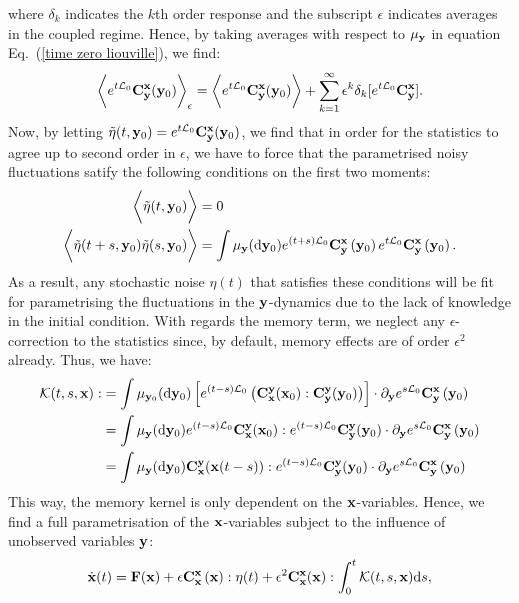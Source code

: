 \documentclass[12pt]{article}
\begin{document}
where $\delta_k$ indicates the $k$th order response and the subscript $\epsilon$ indicates averages in the coupled regime. Hence, by taking averages with respect to $\mu_{\mathbf{y}}$ in equation Eq.~(\ref{time zero liouville}), we find:
\begin{equation}
	\bigg\langle  e^{t\mathcal{L}_0}\mathbf{C}_{\mathbf{y}}^{\mathbf{x}}(\mathbf{y}_0) \bigg \rangle_{\epsilon} = \bigg\langle  e^{t\mathcal{L}_0}\mathbf{C}_{\mathbf{y}}^{\mathbf{x}}(\mathbf{y}_0) \bigg \rangle + \sum_{k=1}^{\infty}\epsilon ^{k}\delta_k [e^{t\mathcal{L}_0}\mathbf{C}^{\mathbf{x}}_{\mathbf{y}}].
\end{equation}
Now, by letting $\tilde{\eta}(t,\mathbf{y}_0)= e^{t\mathcal{L}_0}\mathbf{C}_{\mathbf{y}}^{\mathbf{x}}(\mathbf{y}_0)$, we find that in order for the statistics to agree up to second order in $\epsilon$, we have to force that the parametrised noisy fluctuations satify the following conditions on the first two moments:
\begin{align}\label{moments1}
	\bigg \langle \tilde{\eta}(t,\mathbf{y}_0) \bigg \rangle &= 0 \\\label{moments2}
	\bigg \langle \tilde{\eta}(t+s,\mathbf{y}_0)\tilde{\eta}(s,\mathbf{y}_0) \bigg \rangle &= \int \mu_{\mathbf{y}}(\mathrm{d} \mathbf{y}_0) e^{(t+s)\mathcal{L}_0}\mathbf{C}_{\mathbf{y}}^{\mathbf{x}}\left(\mathbf{y}_0 \right)e^{t\mathcal{L}_0}\mathbf{C}_{\mathbf{y}}^{\mathbf{x}}\left(\mathbf{y}_0 \right).
\end{align}
As a result, any stochastic noise $\eta(t)$ that satisfies these conditions will be fit for parametrising the fluctuations in the $\mathbf{y}$-dynamics due to the lack of knowledge in the initial condition. With regards the memory term, we neglect any $\epsilon$-correction to the statistics since, by default, memory effects are of order $\epsilon ^2$ already. Thus, we have:
\begin{align}
	\mathcal{K}(t,s,\mathbf{x}):&=\int \mu _{\mathbf{y}_0}(\mathrm{d} \mathbf{y}_0) \left[e^{(t-s)\mathcal{L}_0} \left(\mathbf{C}_{\mathbf{x}}^{\mathbf{y}}(\mathbf{x}_0):\mathbf{C}_{\mathbf{y}}^{\mathbf{y}}(\mathbf{y}_0)  \right)\right]\cdot \partial _{\mathbf{y}}e^{s\mathcal{L}_0}\mathbf{C}_{\mathbf{y}}^{\mathbf{x}}\left(\mathbf{y}_0 \right) \\&= \int \mu _{\mathbf{y}}(\mathrm{d} \mathbf{y}_0)e^{(t-s)\mathcal{L}_0} \mathbf{C}_{\mathbf{x}}^{\mathbf{y}}(\mathbf{x}_0): e^{(t-s)\mathcal{L}_0}\mathbf{C}_{\mathbf{y}}^{\mathbf{y}}(\mathbf{y}_0) \cdot \partial _{\mathbf{y}}e^{s\mathcal{L}_0}\mathbf{C}_{\mathbf{y}}^{\mathbf{x}}\left(\mathbf{y}_0 \right) \\ & =
	\int \mu _{\mathbf{y}}(\mathrm{d} \mathbf{y}_0) \mathbf{C}_{\mathbf{x}}^{\mathbf{y}}(\mathbf{x}(t-s)): e^{(t-s)\mathcal{L}_0}\mathbf{C}_{\mathbf{y}}^{\mathbf{y}}(\mathbf{y}_0) \cdot \partial _{\mathbf{y}}e^{s\mathcal{L}_0}\mathbf{C}_{\mathbf{y}}^{\mathbf{x}}\left(\mathbf{y}_0 \right)
\end{align}
This way, the memory kernel is only dependent on the $\mathbf{x}$-variables. Hence, we find a full parametrisation of the $\mathbf{x}$-variables subject to the influence of unobserved variables $\mathbf{y}$:
\begin{equation}\label{lw parametrisation}
	\dot{\mathbf{x}}(t)=\mathbf{F}(\mathbf{x}) + \epsilon \mathbf{C}_{\mathbf{x}}^{\mathbf{x}}\left(\mathbf{x} \right): \eta(t)+\epsilon^2\mathbf{C}_{\mathbf{x}}^{\mathbf{x}}(\mathbf{x}):\int_{0}^t\mathcal{K}(t,s,\mathbf{x})\mathrm{d} s,
\end{equation}
\end{document}
